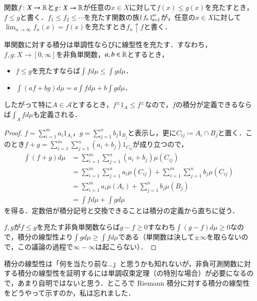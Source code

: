 \begin{defi}
関数$f \colon X \to \mathbb{R}$と$g \colon X \to \mathbb{R}$が任意の$x \in X$に対して$f(x) \leq g(x)$を充たすとき，$f \leq g$と書く．$f_1 \leq f_2 \leq \cdots$を充たす関数の族$\set{f_n}_{n=1}^\infty$が，任意の$x \in X$に対して$\lim_{n\to\infty} f_n(x) = f(x)$を充たすとき$f_n \uparrow f$と書く．
\end{defi}

\begin{lem}
単関数に対する積分は単調性ならびに線型性を充たす．すなわち，$f,g \colon X \to [0,\infty]$を非負単関数，$a,b\in \mathbb{R}$とするとき，
\begin{itemize}
\item $f \leq g$を充たすならば$\int f d \mu \leq \int g d \mu$．
\item $\int (af+bg) d\mu = a\int f d \mu + b\int g d \mu$．
\end{itemize}
したがって特に$A \in \mathcal{A}$とするとき，$f^{\pm} 1_A \leq f^{\pm}$なので，$f$の積分が定義できるならば$\int_A f d\mu$も定義される．
\end{lem}

\begin{proof}
$f = \sum_{i=1}^m a_i 1_{A_i}$，$g = \sum_{j=1}^n b_j 1_{B_j}$と表示し，更に$C_{ij} \coloneqq A_i \cap B_j$と置く．このとき$f+g = \sum_{i=1}^m \sum_{j=1}^n (a_i+b_j)1_{C_{ij}}$が成り立つので，
\begin{align}
\int (f+g) d \mu &= \sum_{i=1}^m \sum_{j=1}^n (a_i + b_j) \mu(C_{ij}) \\
&= \sum_{i=1}^m \sum_{j=1}^n a_i \mu(C_{ij}) +  \sum_{i=1}^m \sum_{j=1}^n b_j \mu(C_{ij}) \\
&= \sum_{i=1}^m a_i \mu(A_i) + \sum_{j=1}^n b_j \mu(B_j) \\
&= \int f d\mu + \int g d\mu
\end{align}を得る．定数倍が積分記号と交換できることは積分の定義から直ちに従う．

$f,g$が$f \leq g$を充たす非負単関数ならば$g -f \geq 0$すなわち$\int (g-f) d\mu \geq 0$なので，積分の線型性より$\int g d \mu \geq \int f d \mu$である（単関数は決して$\pm \infty$を取らないので，この議論の過程で$\infty - \infty$は起こらない）．
\end{proof}

\begin{dig}
積分の線型性は「何を当たり前な…」と思うかも知れないが，非負可測関数に対する積分の線型性を証明するには単調収束定理（の特別な場合）が必要になるので，あまり自明ではないと思う．ところで Riemann 積分に対する積分の線型性をどうやって示すのか，私は忘れました．
\end{dig}

